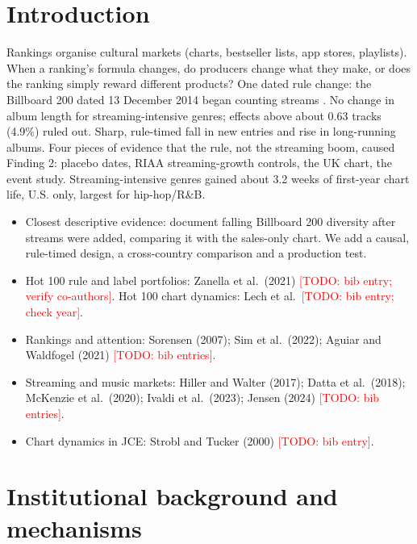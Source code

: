 \documentclass[pdflatex,sn-apa]{sn-jnl}
\newcommand{\todo}[1]{\textcolor{red}{[TODO: #1]}}
\begin{document}
\section{Introduction}\label{sec:intro}

   Rankings organise cultural markets (charts, bestseller lists, app stores, playlists). When a ranking's formula changes, do producers change what they make, or does the ranking simply reward different products?
  One dated rule change: the Billboard 200 dated 13 December 2014 began counting streams \citep{billboard2014makeover}.
   No change in album length for streaming-intensive genres; effects above about 0.63 tracks (4.9\%) ruled out.
 Sharp, rule-timed fall in new entries and rise in long-running albums.
   Four pieces of evidence that the rule, not the streaming boom, caused Finding 2: placebo dates, RIAA streaming-growth controls, the UK chart, the event study.
  Streaming-intensive genres gained about 3.2 weeks of first-year chart life, U.S. only, largest for hip-hop/R\&B.
    \begin{itemize}
      \item Closest descriptive evidence: \citet{schneider2019five} document falling Billboard 200 diversity after streams were added, comparing it with the sales-only chart. We add a causal, rule-timed design, a cross-country comparison and a production test.
      \item Hot 100 rule and label portfolios: Zanella et al.\ (2021) \todo{bib entry; verify co-authors}. Hot 100 chart dynamics: Lech et al.\ \todo{bib entry; check year}.
      \item Rankings and attention: Sorensen (2007); Sim et al.\ (2022); Aguiar and Waldfogel (2021) \todo{bib entries}.
      \item Streaming and music markets: Hiller and Walter (2017); Datta et al.\ (2018); McKenzie et al.\ (2020); Ivaldi et al.\ (2023); Jensen (2024) \todo{bib entries}.
      \item Chart dynamics in JCE: Strobl and Tucker (2000) \todo{bib entry}.
    \end{itemize}


\section{Institutional background and mechanisms}\label{sec:background}
\end{document}
